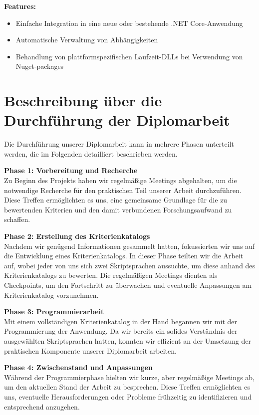 \textbf{Features:}
\begin{itemize}
    \item Einfache Integration in eine neue oder bestehende .NET Core-Anwendung
    \item Automatische Verwaltung von Abhängigkeiten
    \item Behandlung von plattformspezifischen Laufzeit-DLLs bei Verwendung von Nuget-packages
\end{itemize}

\newpage
\section{Beschreibung über die Durchführung der Diplomarbeit}

Die Durchführung unserer Diplomarbeit kann in mehrere Phasen unterteilt werden, 
die im Folgenden detailliert beschrieben werden.

\textbf{Phase 1: Vorbereitung und Recherche}\\
Zu Beginn des Projekts haben wir regelmäßige Meetings abgehalten, um die notwendige 
Recherche für den praktischen Teil unserer Arbeit durchzuführen. Diese Treffen 
ermöglichten es uns, eine gemeinsame Grundlage für die zu bewertenden Kriterien und 
den damit verbundenen Forschungsaufwand zu schaffen.

\textbf{Phase 2: Erstellung des Kriterienkatalogs}\\
Nachdem wir genügend Informationen gesammelt hatten, fokussierten wir uns auf 
die Entwicklung eines Kriterienkatalogs. In dieser Phase teilten wir die Arbeit auf, 
wobei jeder von uns sich zwei Skriptsprachen aussuchte, um diese anhand des 
Kriterienkatalogs zu bewerten. Die regelmäßigen Meetings dienten als Checkpoints, 
um den Fortschritt zu überwachen und eventuelle Anpassungen am Kriterienkatalog vorzunehmen.

\textbf{Phase 3: Programmierarbeit}\\
Mit einem vollständigen Kriterienkatalog in der Hand begannen wir mit der 
Programmierung der Anwendung. Da wir bereits ein solides Verständnis der ausgewählten 
Skriptsprachen hatten, konnten wir effizient an der Umsetzung der praktischen 
Komponente unserer Diplomarbeit arbeiten.

\textbf{Phase 4: Zwischenstand und Anpassungen}\\
Während der Programmierphase hielten wir kurze, aber regelmäßige Meetings ab, 
um den aktuellen Stand der Arbeit zu besprechen. Diese Treffen ermöglichten es uns, 
eventuelle Herausforderungen oder Probleme frühzeitig zu identifizieren und entsprechend anzugehen.

